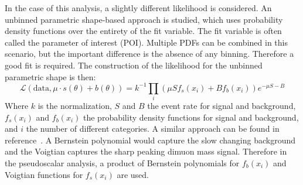 In the case of this analysis, a slightly different likelihood is considered. An unbinned parametric shape-based approach is studied, which uses probability density functions over the entirety of the fit variable. The fit variable is often called the parameter of interest (POI). Multiple PDFs can be combined in this scenario, but the important difference is the absence of any binning. Therefore a good fit is required.  
The construction of the likelihood for the unbinned parametric shape is then:
 \begin{equation}\mathcal{L}(\text{data},\mu\cdot s(\theta)+b(\theta)) = k^{-1} \prod_i(\mu S f_s(x_i) + B f_b(x_i))e^{-\mu S - B}\end{equation}
Where $k$ is the normalization, $S$ and $B$ the event rate for signal and background, $f_s(x_i)$ and $f_b(x_i)$ the probability density functions for signal and background, and $i$ the number of different categories. A similar approach can be found in reference~\cite{Aaboud_2018}.
A Bernstein polynomial would capture the slow changing background and the Voigtian captures the sharp peaking dimuon mass signal.
Therefore in the pseudoscalar analysis, a product of Bernstein polynomials for $f_b(x_i)$ and Voigtian functions for $f_s(x_i)$ are used.   

